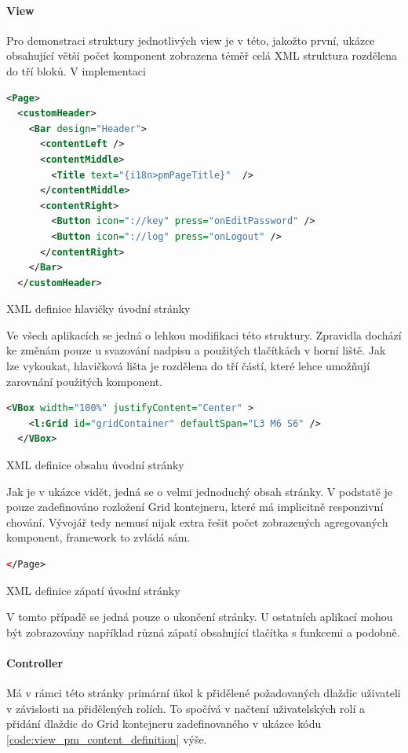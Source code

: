 \documentclass[thesis=M,czech]{FITthesis}[2012/06/26]
\begin{document}
\paragraph{View}
Pro demonstraci struktury jednotlivých view je v této, jakožto první, ukázce obsahující větší počet komponent zobrazena téměř celá XML struktura rozdělena do tří bloků. V implementaci 
\begin{algorithm}[H]
	\begin{lstlisting}[language=xml]      
<Page>
  <customHeader>
    <Bar design="Header">
      <contentLeft />
      <contentMiddle>
        <Title text="{i18n>pmPageTitle}"  />
      </contentMiddle>
      <contentRight>
        <Button icon="://key" press="onEditPassword" />
        <Button icon="://log" press="onLogout" />
      </contentRight>
    </Bar>
  </customHeader>
	\end{lstlisting}
	\caption{XML definice hlavičky úvodní stránky}	
	\label{code:view_pm_header_definition}
	\small Ve všech aplikacích se jedná o lehkou modifikaci této struktury. Zpravidla dochází ke změnám pouze u svazování nadpisu a použitých tlačítkách v horní liště. Jak lze vykoukat, hlavičková lišta je rozdělena do tří částí, které lehce umožňují zarovnání použitých komponent.
\end{algorithm}	
\begin{algorithm}[H]
	\begin{lstlisting}[language=xml]      
  <VBox width="100%" justifyContent="Center" >
    <l:Grid id="gridContainer" defaultSpan="L3 M6 S6" />
  </VBox>
	\end{lstlisting}
	\caption{XML definice obsahu úvodní stránky}	
	\label{code:view_pm_content_definition}
	\small Jak je v ukázce vidět, jedná se o velmi jednoduchý obsah stránky. V podstatě je pouze zadefinováno rozložení Grid kontejneru, které má implicitně responzivní chování. Vývojář tedy nemusí nijak extra řešit počet zobrazených agregovaných komponent, framework to zvládá sám.  
\end{algorithm}	
\begin{algorithm}[H]
	\begin{lstlisting}[language=xml]      
</Page>
	\end{lstlisting}
	\caption{XML definice zápatí úvodní stránky}	
	\label{code:view_pm_footer_definition}
	\small V tomto případě se jedná pouze o ukončení stránky. U ostatních aplikací mohou být zobrazovány například různá zápatí obsahující tlačítka s funkcemi a podobně.
\end{algorithm}	
\paragraph{Controller} Má v rámci této stránky primární úkol k přidělené požadovaných dlaždic uživateli v závislosti na přidělených rolích. To spočívá v načtení uživatelských rolí a přidání dlaždic do Grid kontejneru zadefinovaného v ukázce kódu \ref{code:view_pm_content_definition} výše. 
\end{document}
